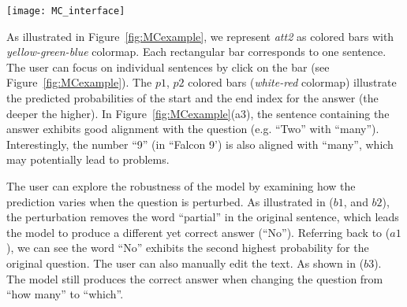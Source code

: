 \begin{figure*}[t]
\centering
\vspace{-2mm}
 \texttt{[image: MC\_interface]}
  \vspace{-7mm}
 \caption{
In the machine comprehension visualization interface (a), the $p1$, $p2$ colored bar (in $a3$) illustrate the predicted start and end index of the answer in the context (the deeper the red the higher the probability). The most likely answer is shown in ($a1$). The global and local attention are visualized by ($a2$, $a3$).
%
We can evaluate the robustness of the prediction by perturbing the question sentence ($b1$, $b3$). As illustrated in ($b1$, $b2$) by removing the word ``partial'' the model still find the correct answer (albeit different, as the sentence perturbation changes the exact meaning of the question). 
}
\label{fig:MCexample}
\end{figure*}

As illustrated in Figure~\ref{fig:MCexample}, we represent \emph{att2} as colored bars with \emph{yellow-green-blue} colormap. Each rectangular bar corresponds to one sentence. The user can focus on individual sentences by click on the bar (see Figure~\ref{fig:MCexample}).
The $p1$, $p2$ colored bars (\emph{white-red} colormap) illustrate the predicted probabilities of the start and the end index for the answer (the deeper the higher). %
%
In Figure~\ref{fig:MCexample}(a3), the sentence containing the answer exhibits good alignment with the question (e.g. ``Two'' with ``many'').
Interestingly, the number ``9'' (in ``Falcon 9') is also aligned with ``many'', which may potentially lead to problems.

The user can explore the robustness of the model by examining how the prediction varies when the question is perturbed.
%
As illustrated in ($b1$, and $b2$), the perturbation removes the word ``partial'' in the original sentence, which leads the model to produce a different yet correct answer (``No''). Referring back to ($a1$), we can see the word ``No'' exhibits the second highest probability for the original question.
%
The user can also manually edit the text. As shown in ($b3$). The model still produces the correct answer when changing the question from ``how many'' to ``which''.
